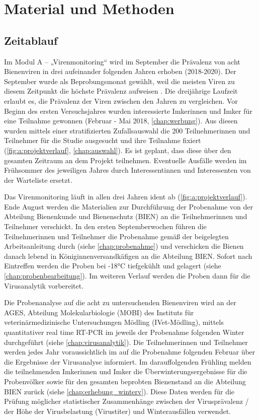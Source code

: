 \section{Material und Methoden}

\subsection{Zeitablauf}

Im Modul A – „Virenmonitoring“ wird im September die Prävalenz von acht Bienenviren in drei aufeinander folgenden Jahren erhoben (2018-2020). Der September wurde als Beprobungsmonat gewählt, weil die meisten Viren zu diesem Zeitpunkt die höchste Prävalenz aufweisen \citep{demiranda2013}. Die dreijährige Laufzeit erlaubt es, die Prävalenz der Viren zwischen den Jahren zu vergleichen.
Vor Beginn des ersten Versuchsjahres wurden interessierte Imkerinnen und Imker für eine Teilnahme gewonnen (Februar - Mai 2018, \cref{chap:werbung}). Aus diesen wurden mittels einer stratifizierten Zufallsauswahl die 200 Teilnehmerinnen und Teilnehmer für die Studie ausgesucht und ihre Teilnahme fixiert (\cref{fig:a:projektverlauf}, \cref{chap:auswahl}). Es ist geplant, dass diese über den gesamten Zeitraum an dem Projekt teilnehmen. Eventuelle Ausfälle werden im Frühsommer des jeweiligen Jahres durch Interessentinnen und Interessenten von der Warteliste ersetzt.

Das Virenmonitoring läuft in allen drei Jahren ident ab (\cref{fig:a:projektverlauf}). Ende August werden die Materialien zur Durchführung der Probenahme von der Abteilung Bienenkunde und Bienenschutz (BIEN) an die Teilnehmerinnen und Teilnehmer verschickt. In den ersten Septemberwochen führen die Teilnehmerinnen und Teilnehmer die Probenahme gemäß der beigelegten Arbeitsanleitung durch (siehe \cref{chap:probenahme}) und verschicken die Bienen danach lebend in Königinnenversandkäfigen an die Abteilung BIEN. Sofort nach Eintreffen werden die Proben bei -18°C tiefgekühlt und gelagert (siehe \cref{chap:probenbearbeitung}). Im weiteren Verlauf werden die Proben dann für die Virusanalytik vorbereitet.

Die Probenanalyse auf die acht zu untersuchenden Bienenviren wird an der AGES, Abteilung Molekularbiologie (MOBI) des Instituts für veterinärmedizinische Untersuchungen Mödling (IVet-Mödling), mittels quantitativer real time RT-PCR im jeweils der Probenahme folgenden Winter durchgeführt (siehe \cref{chap:virusanalytik}). Die Teilnehmerinnen und Teilnehmer werden jedes Jahr voraussichtlich im auf die Probenahme folgenden Februar über die Ergebnisse der Virusanalyse informiert. Im darauffolgenden Frühling melden die teilnehmenden Imkerinnen und Imker die Überwinterungsergebnisse für die Probenvölker sowie für den gesamten beprobten Bienenstand an die Abteilung BIEN zurück (siehe \cref{chap:erhebung_winterv}). Diese Daten werden für die Prüfung möglicher statistischer Zusammenhänge zwischen der Virusprävalenz / der Höhe der Virusbelastung (Virustiter) und Winterausfällen verwendet.

